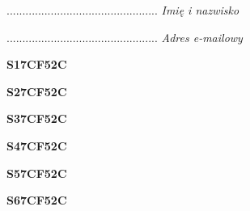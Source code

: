 \begin{turn}{90}\begin{minipage}{\linewidth} \vspace{20mm} ................................................  \textit{Imię i nazwisko}\end{minipage}\end{turn}

\begin{turn}{90}\begin{minipage}{\linewidth} \vspace{20mm} ................................................  \textit{Adres e-mailowy}\end{minipage}\end{turn}

\begin{turn}{90}\huge \begin{minipage}{\linewidth} \vspace{10mm}\textbf{S17CF52C}\end{minipage}\end{turn}

\begin{turn}{90}\huge \begin{minipage}{\linewidth} \vspace{10mm}\textbf{S27CF52C}\end{minipage}\end{turn}

\begin{turn}{90}\huge \begin{minipage}{\linewidth} \vspace{10mm}\textbf{S37CF52C}\end{minipage}\end{turn}

\begin{turn}{90}\huge \begin{minipage}{\linewidth} \vspace{10mm}\textbf{S47CF52C}\end{minipage}\end{turn}

\begin{turn}{90}\huge \begin{minipage}{\linewidth} \vspace{10mm}\textbf{S57CF52C}\end{minipage}\end{turn}

\begin{turn}{90}\huge \begin{minipage}{\linewidth} \vspace{10mm}\textbf{S67CF52C}\end{minipage}\end{turn}

